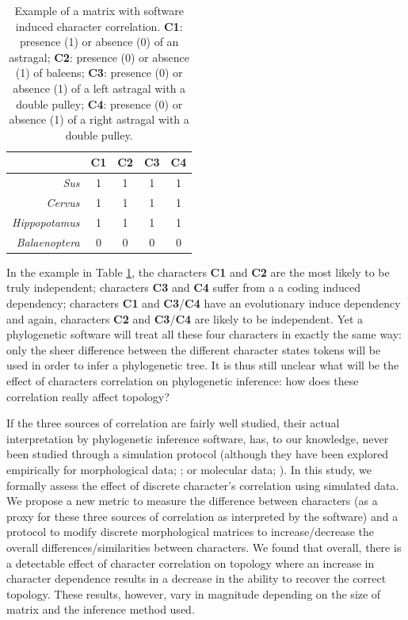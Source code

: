 \documentclass[12pt,letterpaper]{article}
\begin{document}
\begin{table}
\center
    \begin{tabular}{r|cccc}
            & C1 & C2 & C3 & C4\\
        \hline
        \textit{Sus} & 1 & 1 & 1 & 1\\
        \textit{Cervus} & 1 & 1 & 1 & 1\\
        \textit{Hippopotamus} & 1 & 1 & 1 & 1\\
        \textit{Balaenoptera} & 0 & 0 & 0 & 0\\
    \end{tabular}
    \caption{Example of a matrix with software induced character correlation. \textbf{C1}: presence (1) or absence (0) of an astragal; \textbf{C2}: presence (0) or absence (1) of baleens; \textbf{C3}: presence (0) or absence (1) of a left astragal with a double pulley; \textbf{C4}: presence (0) or absence (1) of a right astragal with a double pulley.}
    \label{Tab:example_matrix}
\end{table}

In the example in Table \ref{Tab:example_matrix}, the characters \textbf{C1} and \textbf{C2} are the most likely to be truly independent; characters \textbf{C3} and \textbf{C4} suffer from a a coding induced dependency; characters \textbf{C1} and \textbf{C3}/\textbf{C4} have an evolutionary induce dependency and again, characters \textbf{C2} and \textbf{C3}/\textbf{C4} are likely to be independent.
Yet a phylogenetic software will treat all these four characters in exactly the same way: only the sheer difference between the different character states tokens will be used in order to infer a phylogenetic tree.
It is thus still unclear what will be the effect of characters correlation on phylogenetic inference: how does these correlation really affect topology?

If the three sources of correlation are fairly well studied, their actual interpretation by phylogenetic inference software, has, to our knowledge, never been studied through a simulation protocol (although they have been explored empirically for morphological data; \citealt{Davalos01072014}; or molecular data; \citealt{ZouConvergence}).
In this study, we formally assess the effect of discrete character's correlation using simulated data.
We propose a new metric to measure the difference between characters (as a proxy for these three sources of correlation as interpreted by the software) and a protocol to modify discrete morphological matrices to increase/decrease the overall differences/similarities between characters.
We found that overall, there is a detectable effect of character correlation on topology where an increase in character dependence results in a decrease in the ability to recover the correct topology.
These results, however, vary in magnitude depending on the size of matrix and the inference method used.
\end{document}
